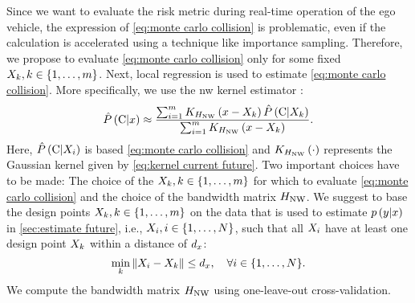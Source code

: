 Since we want to evaluate the risk metric during real-time operation of the ego vehicle, the expression of \cref{eq:monte carlo collision} is problematic, even if the calculation is accelerated using a technique like importance sampling.
Therefore, we propose to evaluate \cref{eq:monte carlo collision} only for some fixed $X_{k}, k\in\{1,\ldots,m\}$.
Next, local regression is used to estimate \cref{eq:monte carlo collision}.
More specifically, we use the \ac{nw} kernel estimator \autocite{wasserman2006nonparametric}:
\begin{equation}
	\hat{P}\left(  \mathrm{C} | x  \right)
	\approx \frac{ \sum_{i=1}^{m}
		K_{H_{\mathrm{NW}}} \left( x - X_{k} \right)
		\hat{P}\left(  \mathrm{C} | X_{k}  \right)
	}{\sum_{i=1}^{m}
		K_{H_{\mathrm{NW}}} \left( x - X_{k} \right)}.
\end{equation}
Here, $\hat{P}\left(  \mathrm{C} | X_{i}  \right)$ is based \cref{eq:monte carlo collision} and $K_{H_{\mathrm{NW}}} \left( \cdot \right)$ represents the Gaussian kernel given by \cref{eq:kernel current future}.
Two important choices have to be made: The choice of the $X_{k}, k\in\{1,\ldots,m\}$ for which to evaluate \cref{eq:monte carlo collision} and the choice of the bandwidth matrix $H_{\mathrm{NW}}$.
We suggest to base the design points $X_{k}, k\in\{1,\ldots,m\}$ on the data that is used to estimate $p\left(  y | x  \right)$ in \cref{sec:estimate future}, i.e., $X_{i}, i \in \{1,\ldots,N\}$, such that all $X_{i}$ have at least one design point $X_{k}$ within a distance of $d_x$:
\begin{equation}
	\min_{k} \left\Vert  X_{i} - X_{k}  \right\Vert \leq d_x,
	\quad \forall i \in \{1, \ldots, N\}.
\end{equation}
We compute the bandwidth matrix $H_{\mathrm{NW}}$ using one-leave-out cross-validation.


